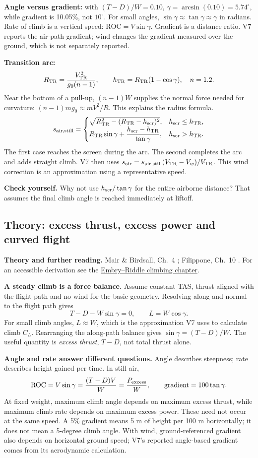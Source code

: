 \documentclass[11pt,letterpaper]{article}
\newcommand{\theorypage}[1]{\clearpage\subsection*{\color{navy}\thesection\enspace Theory: #1}}
\newcommand{\reading}[1]{{\small\color{navy}\textbf{Theory and further reading.} #1\par}\vspace{3pt}}
\newcommand{\selfcheck}[1]{\par\textbf{Check yourself.} #1\par}
\begin{document}
\textbf{Angle versus gradient:} with $(T-D)/W=0.10$,
$\gamma=\arcsin(0.10)=5.74^\circ$, while gradient is 10.05\%, not $10^\circ$.
For small angles, $\sin\gamma\approx\tan\gamma\approx\gamma$ in radians.
Rate of climb is a vertical speed: $\mathrm{ROC}=V\sin\gamma$. Gradient is
a distance ratio. V7 reports the air-path gradient; wind changes the gradient
measured over the ground, which is not separately reported.

\textbf{Transition arc:}
\[
R_{\rm TR}=\frac{V_{\rm TR}^2}{g_0(n-1)},\qquad
h_{\rm TR}=R_{\rm TR}(1-\cos\gamma),\quad n=1.2.
\]
Near the bottom of a pull-up, $(n-1)W$ supplies the normal force needed for
curvature: $(n-1)mg_0\approx mV^2/R$. This explains the radius formula.
\[
s_{\rm air,still}=\begin{cases}
\sqrt{R_{\rm TR}^2-(R_{\rm TR}-h_{\rm scr})^2},&h_{\rm scr}\le h_{\rm TR},\\
R_{\rm TR}\sin\gamma+\dfrac{h_{\rm scr}-h_{\rm TR}}{\tan\gamma},&h_{\rm scr}>h_{\rm TR}.
\end{cases}
\]
The first case reaches the screen during the arc. The second completes the arc
and adds straight climb. V7 then uses
$s_{\rm air}=s_{\rm air,still}(V_{\rm TR}-V_w)/V_{\rm TR}$.
This wind correction is an approximation using a representative speed.
\selfcheck{Why not use $h_{\rm scr}/\tan\gamma$ for the entire airborne distance?
That assumes the final climb angle is reached immediately at liftoff.}


\theorypage{excess thrust, excess power and curved flight}
\reading{Mair \& Birdsall, Ch.~4 \cite{mair}; Filippone, Ch.~10 \cite{filippone}. For an accessible derivation see the \href{https://eaglepubs.erau.edu/introductiontoaerospaceflightvehicles/chapter/climbing-ceiling-gliding/}{Embry--Riddle climbing chapter}.}
\textbf{A steady climb is a force balance.}
Assume constant TAS, thrust aligned with the flight path and no wind for the
basic geometry. Resolving along and normal to the flight path gives
\[
T-D-W\sin\gamma=0,\qquad L=W\cos\gamma.
\]
For small climb angles, $L\approx W$, which is the approximation V7 uses to
calculate climb $C_L$. Rearranging the along-path balance gives
$\sin\gamma=(T-D)/W$. The useful quantity is \emph{excess thrust}, $T-D$,
not total thrust alone.

\textbf{Angle and rate answer different questions.}
Angle describes steepness; rate describes height gained per time. In still air,
\[
\mathrm{ROC}=V\sin\gamma=\frac{(T-D)V}{W}
=\frac{P_{\rm excess}}{W},\qquad
\text{gradient}=100\tan\gamma.
\]
At fixed weight, maximum climb angle depends on maximum excess thrust, while
maximum climb rate depends on maximum excess power. These need not occur at
the same speed. A 5\% gradient means 5 m of height per 100 m horizontally;
it does not mean a 5-degree climb angle. With wind, ground-referenced gradient
also depends on horizontal ground speed; V7's reported angle-based gradient
comes from its aerodynamic calculation.
\end{document}
